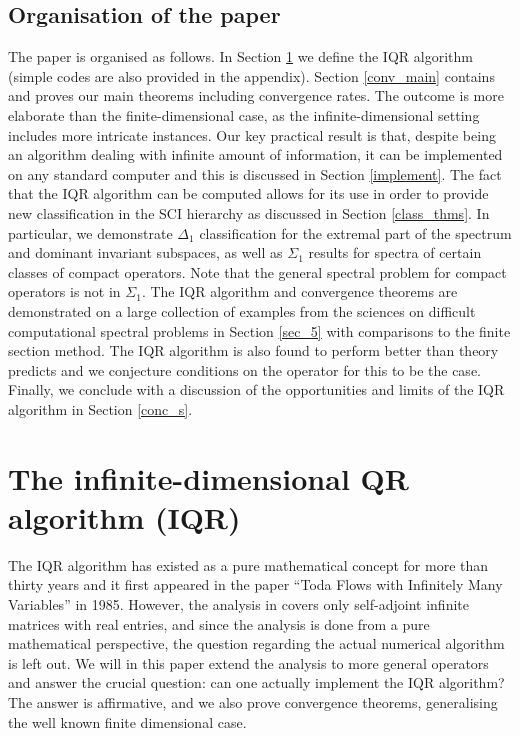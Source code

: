 \documentclass[a4paper,10pt]{article}
\begin{document}
\subsection{Organisation of the paper}

The paper is organised as follows. In Section \ref{IQR_s1} we define the IQR algorithm (simple codes are also provided in the appendix). Section \ref{conv_main} contains and proves our main theorems including convergence rates. The outcome is more elaborate than the finite-dimensional case, as the infinite-dimensional setting includes more intricate instances. Our key practical result is that, despite being an algorithm dealing with infinite amount of information, it can be implemented on any standard computer and this is discussed in Section \ref{implement}. The fact that the IQR algorithm can be computed allows for its use in order to provide new classification in the SCI hierarchy as discussed in Section \ref{class_thms}. In particular, we demonstrate $\Delta_1$ classification for the extremal part of the spectrum and dominant invariant subspaces, as well as $\Sigma_1$ results for spectra of certain classes of compact operators. Note that the general spectral problem for compact operators is not in $\Sigma_1$. The IQR algorithm and convergence theorems are demonstrated on a large collection of examples from the sciences on difficult computational spectral problems in Section \ref{sec_5} with comparisons to the finite section method. The IQR algorithm is also found to perform better than theory predicts and we conjecture conditions on the operator for this to be the case. Finally, we conclude with a discussion of the opportunities and limits of the IQR algorithm in Section \ref{conc_s}.


\section{The infinite-dimensional QR algorithm (IQR)}
\label{IQR_s1}
The IQR algorithm has existed as a pure mathematical concept for more
than thirty years and it first appeared in the paper ``Toda Flows with
Infinitely Many Variables'' \cite{deift1985toda} in 1985. However, the analysis in \cite{deift1985toda} 
covers only self-adjoint infinite matrices with real entries, and since the analysis is done from 
a pure mathematical perspective, the question regarding the actual numerical algorithm is left out. 
We will in this paper extend the analysis to more general operators and answer the crucial question: can one actually implement the IQR algorithm? The answer is affirmative, and we also prove convergence theorems, generalising the well known finite dimensional case.
\end{document}
